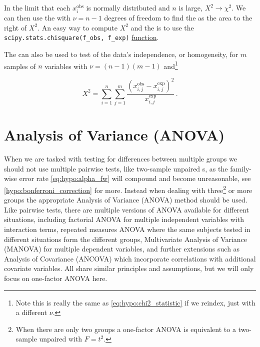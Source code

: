 In the limit that each $x^{\text{obs}}_{i}$ is normally distributed and $n$ is large, $X^{2} \to \chi^{2}$.
We can then use the \chiSqdist with $\nu = n-1$ degrees of freedom to find the \pvalue as the area to the right of $X^{2}$.
An easy way to compute $X^{2}$ and the \pvalue is to use the \texttt{scipy.stats.chisquare(f\_obs, f\_exp)}
\href{https://docs.scipy.org/doc/scipy/reference/generated/scipy.stats.chisquare.html}{function}.

The \chiSqtest can also be used to test of the data's independence, or homogeneity,
for $m$ samples of $n$ variables with $\nu = \left(n-1\right)\left(m-1\right)$ and\footnote{Note this is really the same as \cref{eq:hypo:chi2_statistic} if we reindex, just with a different $\nu$.}

\begin{equation}\label{eq:hypo:chi2_statistic_ind}
X^{2} = \sum_{i=1}^{n} \sum_{j=1}^{m} \frac{\left(x^{\text{obs}}_{i,j} - x^{\text{exp}}_{i,j}\right)^{2}}{x^{\text{exp}}_{i,j}}\,.
\end{equation}

\section{Analysis of Variance (ANOVA)}
\label{hypo:ANOVA}

When we are tasked with testing for differences between multiple groups
we should not use multiple pairwise tests, like two-sample unpaired {\ttest}s,
as the family-wise error rate \cref{eq:hypo:alpha_fw}
will compound and become unreasonable, see \cref{hypo:bonferroni_correction} for more.
Instead when dealing with three\footnote{When there are only two groups a one-factor ANOVA is equivalent to a two-sample unpaired \ttest with $F=t^{2}$.} or more groups
the appropriate Analysis of Variance (ANOVA) method should be used.
Like pairwise tests, there are multiple versions of ANOVA available for different situations, including
factorial ANOVA for multiple independent variables with interaction terms,
repeated measures ANOVA where the same subjects tested in different situations form the different groups,
Multivariate Analysis of Variance (MANOVA) for multiple dependent variables,
and further extensions such as Analysis of Covariance (ANCOVA) which incorporate correlations with additional covariate variables.
All share similar principles and assumptions,
but we will only focus on one-factor ANOVA here.

